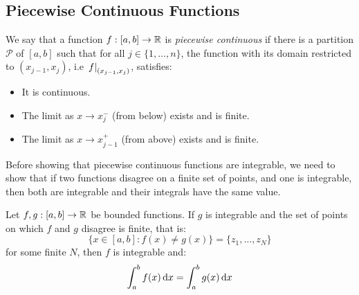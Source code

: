 \documentclass[../main.tex]{subfiles}
\begin{document}
\subsection{Piecewise Continuous Functions}
\begin{definition}
  We say that a function $f: [a, b] \to \mathbb{R}$ is \textit{piecewise continuous} if there is a partition $\mathcal{P}$ of $[a, b]$ such that for all $j \in \{1, \ldots, n\}$, the function with its domain restricted to $(x_{j - 1}, x_{j})$, i.e $\left. f \right|_{(x_{j - 1}, x_j)}$, satisfies:
  \begin{itemize}
    \item It is continuous.
    \item The limit as $x \to x_j^{-}$ (from below) exists and is finite.
    \item The limit as $x \to x_{j - 1}^{+}$ (from above) exists and is finite.
  \end{itemize}
\end{definition}
Before showing that piecewise continuous functions are integrable, we need to show that if two functions disagree on a finite set of points, and one is integrable, then both are integrable and their integrals have the same value.
\begin{lemma}
  Let $f, g: [a, b] \to \mathbb{R}$ be bounded functions.
  If $g$ is integrable and the set of points on which $f$ and $g$ disagree is finite, that is:
  \label{integrabilityFiniteDifference}
  \[
    \{x \in [a, b]: f(x) \neq g(x)\} = \{z_1, \ldots, z_N\}
  \]
  for some finite $N$, then $f$ is integrable and:
  \[
    \int_{a}^{b} f(x) \d{x} = \int_{a}^{b} g(x) \d{x}
  \]
\end{lemma}
\end{document}
